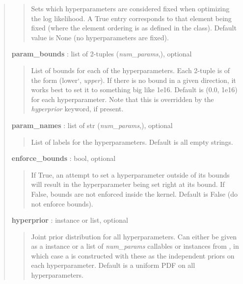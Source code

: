 \documentclass[letterpaper,10pt,english]{sphinxmanual}
\begin{document}
\begin{fulllineitems}
\begin{quote}
\begin{description}
\begin{quote}
Sets which hyperparameters are considered fixed when optimizing the log
likelihood. A True entry corresponds to that element being
fixed (where the element ordering is as defined in the class).
Default value is None (no hyperparameters are fixed).
\end{quote}

\textbf{param\_bounds} : list of 2-tuples (\emph{num\_params},), optional
\begin{quote}

List of bounds for each of the hyperparameters. Each 2-tuple is of the
form (lower{}`, \emph{upper}). If there is no bound in a given direction, it
works best to set it to something big like 1e16. Default is (0.0, 1e16)
for each hyperparameter. Note that this is overridden by the \emph{hyperprior}
keyword, if present.
\end{quote}

\textbf{param\_names} : list of str (\emph{num\_params},), optional
\begin{quote}

List of labels for the hyperparameters. Default is all empty strings.
\end{quote}

\textbf{enforce\_bounds} : bool, optional
\begin{quote}

If True, an attempt to set a hyperparameter outside of its bounds will
result in the hyperparameter being set right at its bound. If False,
bounds are not enforced inside the kernel. Default is False (do not
enforce bounds).
\end{quote}

\textbf{hyperprior} :  instance or list, optional
\begin{quote}

Joint prior distribution for all hyperparameters. Can either be given
as a  instance or a list of \emph{num\_params}
callables or  instances from ,
in which case a  is constructed with
these as the independent priors on each hyperparameter. Default is a
uniform PDF on all hyperparameters.
\end{quote}

\end{description}\end{quote}

\begin{fulllineitems}
\label{gptools:gptools.mean.MeanFunction.__call__}
\end{fulllineitems}


\end{fulllineitems}
\end{document}
